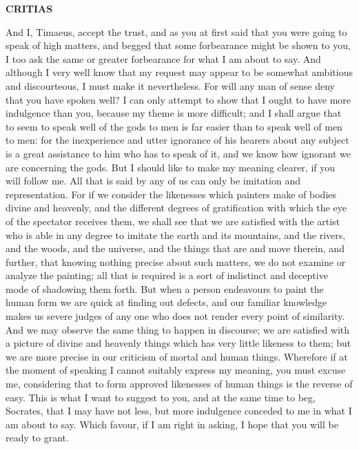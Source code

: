\documentclass[11pt,letter]{article}
\begin{document}
\par \textbf{CRITIAS}
\par   And I, Timaeus, accept the trust, and as you at first said that you were going to speak of high matters, and begged that some forbearance might be shown to you, I too ask the same or greater forbearance for what I am about to say. And although I very well know that my request may appear to be somewhat ambitious and discourteous, I must make it nevertheless. For will any man of sense deny that you have spoken well? I can only attempt to show that I ought to have more indulgence than you, because my theme is more difficult; and I shall argue that to seem to speak well of the gods to men is far easier than to speak well of men to men:  for the inexperience and utter ignorance of his hearers about any subject is a great assistance to him who has to speak of it, and we know how ignorant we are concerning the gods. But I should like to make my meaning clearer, if you will follow me. All that is said by any of us can only be imitation and representation. For if we consider the likenesses which painters make of bodies divine and heavenly, and the different degrees of gratification with which the eye of the spectator receives them, we shall see that we are satisfied with the artist who is able in any degree to imitate the earth and its mountains, and the rivers, and the woods, and the universe, and the things that are and move therein, and further, that knowing nothing precise about such matters, we do not examine or analyze the painting; all that is required is a sort of indistinct and deceptive mode of shadowing them forth. But when a person endeavours to paint the human form we are quick at finding out defects, and our familiar knowledge makes us severe judges of any one who does not render every point of similarity. And we may observe the same thing to happen in discourse; we are satisfied with a picture of divine and heavenly things which has very little likeness to them; but we are more precise in our criticism of mortal and human things. Wherefore if at the moment of speaking I cannot suitably express my meaning, you must excuse me, considering that to form approved likenesses of human things is the reverse of easy. This is what I want to suggest to you, and at the same time to beg, Socrates, that I may have not less, but more indulgence conceded to me in what I am about to say. Which favour, if I am right in asking, I hope that you will be ready to grant.
\end{document}
